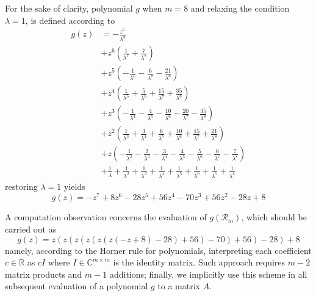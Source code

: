 For the sake of clarity, polynomial $g$ when $m=8$ and relaxing the condition $\lambda=1$, is defined according to 
\begin{displaymath}
\begin{split}
g{\left (z \right )} &= - \frac{z^{7}}{\lambda^{8}} \\
&+ z^{6} \left(\frac{1}{\lambda^{7}} + \frac{7}{\lambda^{8}}\right) \\
&+ z^{5} \left(- \frac{1}{\lambda^{6}} - \frac{6}{\lambda^{7}} - \frac{21}{\lambda^{8}}\right) \\
&+ z^{4} \left(\frac{1}{\lambda^{5}} + \frac{5}{\lambda^{6}} + \frac{15}{\lambda^{7}} + \frac{35}{\lambda^{8}}\right) \\
&+ z^{3} \left(- \frac{1}{\lambda^{4}} - \frac{4}{\lambda^{5}} - \frac{10}{\lambda^{6}} - \frac{20}{\lambda^{7}} - \frac{35}{\lambda^{8}}\right) \\
&+ z^{2} \left(\frac{1}{\lambda^{3}} + \frac{3}{\lambda^{4}} + \frac{6}{\lambda^{5}} + \frac{10}{\lambda^{6}} + \frac{15}{\lambda^{7}} + \frac{21}{\lambda^{8}}\right) \\
&+ z \left(- \frac{1}{\lambda^{2}} - \frac{2}{\lambda^{3}} - \frac{3}{\lambda^{4}} - \frac{4}{\lambda^{5}} - \frac{5}{\lambda^{6}} - \frac{6}{\lambda^{7}} - \frac{7}{\lambda^{8}}\right) \\
&+ \frac{1}{\lambda} + \frac{1}{\lambda^{2}} + \frac{1}{\lambda^{3}} + \frac{1}{\lambda^{4}} + \frac{1}{\lambda^{5}} + \frac{1}{\lambda^{6}} + \frac{1}{\lambda^{7}} + \frac{1}{\lambda^{8}}
\end{split}
\end{displaymath}
restoring $\lambda=1$ yields \[g{\left (z \right )} = - z^{7} + 8 z^{6} - 28 z^{5} + 56 z^{4} - 70 z^{3} + 56 z^{2} - 28 z + 8\]

A computation observation concerns the evaluation of $g(\mathcal{R}_{m})$,
which should be carried out as
\begin{displaymath}
g(z) = z \left(z \left(z \left(z \left(z \left(z \left(- z + 8\right) - 28\right) + 56\right) - 70\right) + 56\right) - 28\right) + 8
\end{displaymath}
namely, according to the Horner rule for polynomials, interpreting each
coefficient $c\in\mathbb{R}$ as $cI$ where $I\in\mathbb{C}^{m\times m}$ is the
identity matrix. Such approach requires $m-2$ matrix products and $m-1$
additions; finally, we implicitly use this scheme in all subsequent evaluation
of a polynomial $g$ to a matrix $A$.

